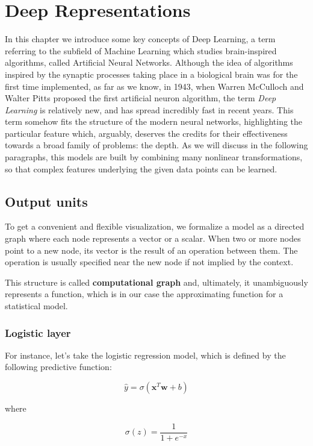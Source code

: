 \documentclass[a4paper, twoside]{article}
\begin{document}
\newpage
\section{Deep Representations}
In this chapter we introduce some key concepts of Deep Learning, a term referring to the subfield of Machine Learning which studies brain-inspired algorithms, called Artificial Neural Networks. Although the idea of algorithms inspired by the synaptic processes taking place in a biological brain was for the first time implemented, as far as we know, in 1943, when Warren McCulloch and Walter Pitts proposed the first artificial neuron algorithm, the term \textit{Deep Learning} is relatively new, and has spread incredibly fast in recent years. This term somehow fits the structure of the modern neural networks, highlighting the particular feature which, arguably, deserves the credits for their effectiveness towards a broad family of problems: the depth. As we will discuss in the following paragraphs, this models are built by combining many nonlinear transformations, so that complex features underlying the given data points can be learned.

    \subsection{Output units}
    To get a convenient and flexible visualization, we formalize a model as a directed graph where each node represents a vector or a scalar. When two or more nodes point to a new node, its vector is the result of an operation between them. The operation is usually specified near the new node if not implied by the context.

    This structure is called \textbf{computational graph} and, ultimately, it unambiguously represents a function, which is in our case the approximating function for a statistical model.

        \subsubsection{Logistic layer}

        For instance, let's take the logistic regression model, which is defined by the following predictive function:

        $$ \hat{y} = \sigma(\boldsymbol{x}^T\boldsymbol{w} + b) $$

        where


        $$\sigma(z)  = \frac{1}{1 + e^{-x}}$$
\end{document}
